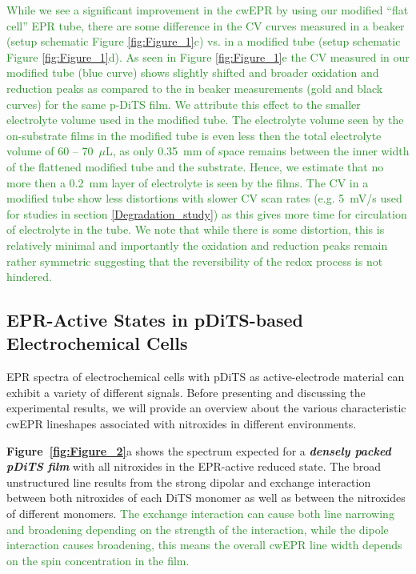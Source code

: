 \documentclass{WileyMSP-template}
\newcommand{\np}[1]{\textcolor{ForestGreen}{#1}}
\begin{document}
\np{While we see a significant improvement in the cwEPR by using our modified ``flat cell'' EPR tube, there are some difference in the CV curves measured in a beaker (setup schematic Figure \ref{fig:Figure_1}c) vs. in a modified tube (setup schematic Figure \ref{fig:Figure_1}d). As seen in Figure \ref{fig:Figure_1}e the CV measured in our modified tube (blue curve) shows slightly shifted and broader oxidation and reduction peaks as compared to the in beaker measurements (gold and black curves) for the same p-DiTS film. We attribute this effect to the smaller electrolyte volume used in the modified tube. The electrolyte volume seen by the on-substrate films in the modified tube is even less then the total electrolyte volume of 60 -- 70~$\mu$L, as only 0.35~mm of space remains between the inner width of the flattened modified tube and the substrate. Hence, we estimate that no more then a 0.2~mm layer of electrolyte is seen by the films. The CV in a modified tube show less distortions with slower CV scan rates (e.g. 5~mV/s used for studies in section \ref{Degradation_study}) as this gives more time for circulation of electrolyte in the tube. We note that while there is some distortion, this is relatively minimal and importantly the oxidation and reduction peaks remain rather symmetric suggesting that the reversibility of the redox process is not hindered.} 
\bigbreak

\subsection{EPR-Active States in pDiTS-based Electrochemical Cells}\label{Classification}
\label{subs:classification}

\bigbreak

EPR spectra of electrochemical cells with pDiTS as active-electrode material can exhibit a variety of different signals. Before presenting and discussing the experimental results, we will provide an overview about the various characteristic cwEPR lineshapes associated with nitroxides in different environments.

\bigbreak

\textbf{Figure~\ref{fig:Figure_2}}a shows the spectrum expected for a \emph{\textbf{densely packed pDiTS film}} with all nitroxides in the EPR-active reduced state. The broad unstructured line results from the strong dipolar and exchange interaction between both nitroxides of each DiTS monomer as well as between the nitroxides of different monomers. \np{The exchange interaction can cause both line narrowing and broadening depending on the strength of the interaction, while the dipole interaction causes broadening, this means the overall cwEPR line width depends on the spin concentration in the film.}%
\end{document}
